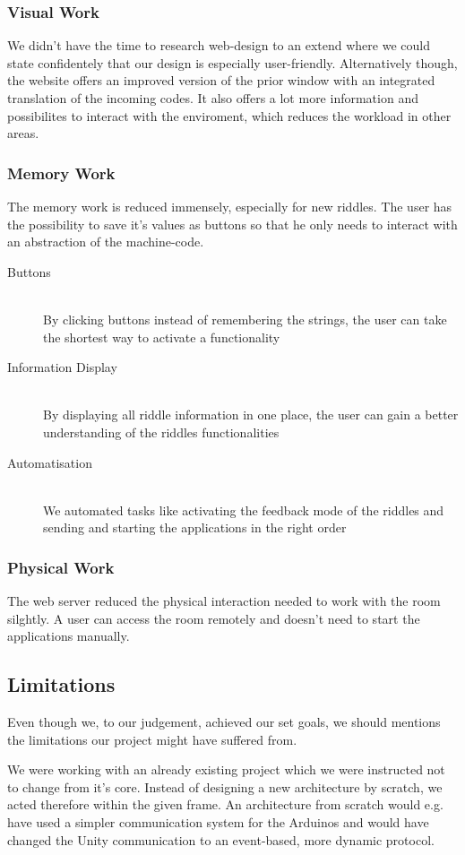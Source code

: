 \subsubsection{Visual Work}
We didn't have the time to research web-design to an extend where we could state confidentely that our design is especially user-friendly.
Alternatively though, the website offers an improved version of the prior window with an integrated translation of the incoming codes.
It also offers a lot more information and possibilites to interact with the enviroment, which reduces the workload in other areas.
\subsubsection{Memory Work}
The memory work is reduced immensely, especially for new riddles. 
The user has the possibility to save it's values as buttons so that he only needs to interact with an abstraction of the machine-code.
\begin{description}
    \item [Buttons] \hfill \\
    By clicking buttons instead of remembering the strings, the user can take the shortest way to activate a functionality
    \item [Information Display] \hfill \\
    By displaying all riddle information in one place, the user can gain a better understanding of the riddles functionalities
    \item [Automatisation] \hfill \\
    We automated tasks like activating the feedback mode of the riddles and sending 
    and starting the applications in the right order
\end{description}
\subsubsection{Physical Work}
The web server reduced the physical interaction needed to work with the room  silghtly. 
A user can access the room remotely and doesn't need to start the applications manually.
\subsection{Limitations}
Even though we, to our judgement, achieved our set goals, 
we should mentions the limitations our project might have suffered from.

We were working with an already existing project which we were instructed not to change from it's core. 
Instead of designing a new architecture by scratch, we acted therefore within the given frame. 
An architecture from scratch would e.g. have used a simpler communication system for the Arduinos and would have changed 
the Unity communication to an event-based, more dynamic protocol.  

